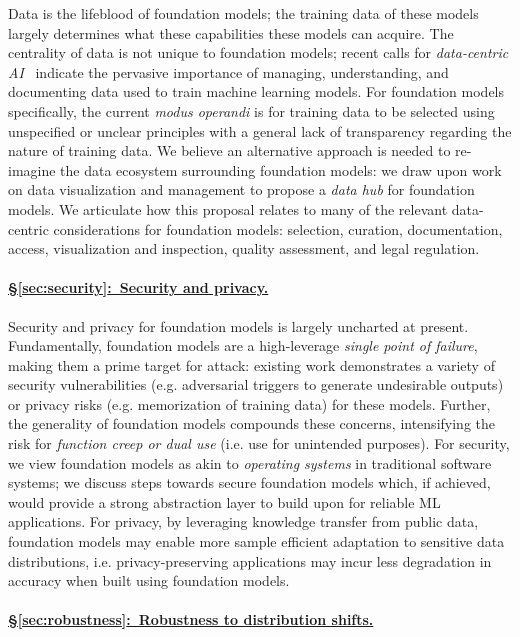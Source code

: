 Data is the lifeblood of foundation models; the training data of these models largely determines what these capabilities these models can acquire. The centrality of data is not unique to foundation models; recent calls for {\em data-centric AI}~\citep{ng_data_centric, hazy_data_centric} indicate the pervasive importance of managing, understanding,  and documenting data used to train machine learning models. For foundation models specifically, the current \textit{modus operandi} is for training data to be selected using unspecified or unclear principles with a general lack of transparency regarding the nature of training data. We believe an alternative approach is needed to re-imagine the data ecosystem surrounding foundation models: we draw upon work on data visualization and management to propose a \textit{data hub} for foundation models. We articulate how this proposal relates to many of the relevant data-centric considerations for foundation models: selection, curation, documentation, access, visualization and inspection, quality assessment, and legal regulation.

\paragraph{\hyperref[sec:security]{§\ref{sec:security}:~Security and privacy.}}

Security and privacy for foundation models is largely uncharted at present. Fundamentally, foundation models are a high-leverage \textit{single point of failure}, making them a prime target for attack: existing work demonstrates a variety of security vulnerabilities (e.g. adversarial triggers to generate undesirable outputs) or privacy risks (e.g. memorization of training data) for these models. Further, the generality of foundation models compounds these concerns, intensifying the risk for \textit{function creep or dual use} (i.e. use for unintended purposes). For security, we view foundation models as akin to \emph{operating systems} in traditional software systems; we discuss steps towards secure foundation models which, if achieved, would provide a strong abstraction layer to build upon for reliable ML applications. For privacy, by leveraging knowledge transfer from public data, foundation models may enable more sample efficient adaptation to sensitive data distributions, i.e. privacy-preserving applications may incur less degradation in accuracy when built using foundation models.

\paragraph{\hyperref[sec:robustness]{§\ref{sec:robustness}:~Robustness to distribution shifts.}}

